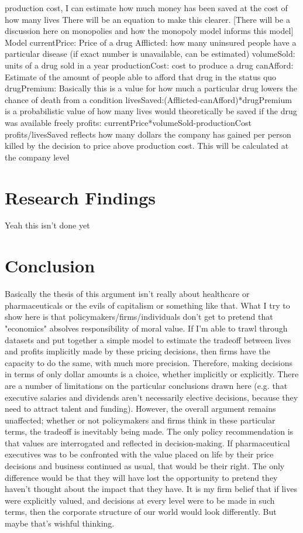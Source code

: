 \documentclass[12pt,english]{article} \usepackage{mathptmx}
\begin{document}
production cost, I can estimate how much money has been saved at the 
cost of how many lives There will be an equation to make this clearer. 
[There will be a discussion here on monopolies and how the monopoly 
model informs this model] Model currentPrice: Price of a drug Afflicted: 
how many uninsured people have a particular disease (if exact number is 
unavailable, can be estimated) volumeSold: units of a drug sold in a 
year productionCost: cost to produce a drug canAfford: Estimate of the 
amount of people able to afford that drug in the status quo drugPremium: 
Basically this is a value for how much a particular drug lowers the 
chance of death from a condition 
livesSaved:(Afflicted-canAfford)*drugPremium is a probabilistic value of 
how many lives would theoretically be saved if the drug was available 
freely profits: currentPrice*volumeSold-productionCost 
profits/livesSaved reflects how many dollars the company has gained per 
person killed by the decision to price above production cost. This will 
be calculated at the company level \section{Research 
Findings}\label{sec:results} Yeah this isn't done yet 
\section{Conclusion}\label{sec:conclusion} Basically the thesis of this 
argument isn't really about healthcare or pharmaceuticals or the evils 
of capitalism or something like that. What I try to show here is that 
policymakers/firms/individuals don't get to pretend that "economics" 
absolves responsibility of moral value. If I'm able to trawl through 
datasets and put together a simple model to estimate the tradeoff 
between lives and profits implicitly made by these pricing decisions, 
then firms have the capacity to do the same, with much more precision. 
Therefore, making decisions in terms of only dollar amounts is a choice, 
whether implicitly or explicitly. There are a number of limitations on 
the particular conclusions drawn here (e.g. that executive salaries and 
dividends aren't necessarily elective decisions, because they need to 
attract talent and funding). However, the overall argument remains 
unaffected; whether or not policymakers and firms think in these 
particular terms, the tradeoff is inevitably being made. The only policy 
recommendation is that values are interrogated and reflected in 
decision-making. If pharmaceutical executives was to be confronted with 
the value placed on life by their price decisions and business continued 
as usual, that would be their right. The only difference would be that 
they will have lost the opportunity to pretend they haven't thought 
about the impact that they have. It is my firm belief that if lives were 
explicitly valued, and decisions at every level were to be made in such 
terms, then the corporate structure of our world would look differently. 
But maybe that's wishful thinking. \vfill \pagebreak{} 
\begin{spacing}{1.0}  
\end{spacing} 
\end{document}
